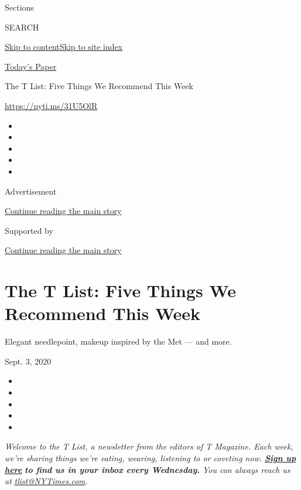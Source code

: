 Sections

SEARCH

\protect\hyperlink{site-content}{Skip to
content}\protect\hyperlink{site-index}{Skip to site index}

\href{https://myaccount.nytimes3xbfgragh.onion/auth/login?response_type=cookie\&client_id=vi}{}

\href{https://www.nytimes3xbfgragh.onion/section/todayspaper}{Today's
Paper}

The T List: Five Things We Recommend This Week

\url{https://nyti.ms/31U5OlR}

\begin{itemize}
\item
\item
\item
\item
\item
\end{itemize}

Advertisement

\protect\hyperlink{after-top}{Continue reading the main story}

Supported by

\protect\hyperlink{after-sponsor}{Continue reading the main story}

\hypertarget{the-t-list-five-things-we-recommend-this-week}{%
\section{The T List: Five Things We Recommend This
Week}\label{the-t-list-five-things-we-recommend-this-week}}

Elegant needlepoint, makeup inspired by the Met --- and more.

Sept. 3, 2020

\begin{itemize}
\item
\item
\item
\item
\item
\end{itemize}

\emph{Welcome to the T List, a newsletter from the editors of T
Magazine. Each week, we're sharing things we're eating, wearing,
listening to or coveting now.}
\textbf{\href{https://www.nytimes3xbfgragh.onion/newsletters/t-list?module=inline}{\emph{Sign
up here}}} \emph{\textbf{to find us in your inbox every Wednesday.}}
\emph{You can always reach us at}
\href{mailto:tlist@NYTimes.com}{\emph{tlist@NYTimes.com}}\emph{.}

